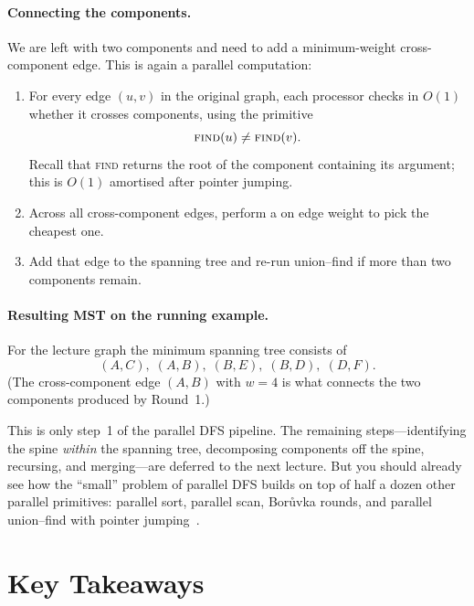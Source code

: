 \paragraph{Connecting the components.}
We are left with two components and need to add a minimum-weight
cross-component edge.  This is again a parallel computation:

\begin{enumerate}
  \item For every edge $(u,v)$ in the original graph, each processor
        checks in $O(1)$ whether it crosses components, using the
        primitive
        \[
          \textsc{find}(u) \neq \textsc{find}(v).
        \]
        Recall that \textsc{find} returns the root of the component
        containing its argument; this is $O(1)$ amortised after
        pointer jumping.
  \item Across all cross-component edges, perform a  on edge weight to pick the cheapest one.
  \item Add that edge to the spanning tree and re-run union--find if
        more than two components remain.
\end{enumerate}

\paragraph{Resulting MST on the running example.}
For the lecture graph the minimum spanning tree consists of
\[
  (A,C),\; (A,B),\; (B,E),\; (B,D),\; (D,F).
\]
(The cross-component edge $(A,B)$ with $w = 4$ is what connects the
two components produced by Round~1.)

\begin{ppnote}
This is only step~1 of the parallel DFS pipeline.  The remaining
steps---identifying the spine \emph{within} the spanning tree,
decomposing components off the spine, recursing, and merging---are
deferred to the next lecture.  But you should already see how the
``small'' problem of parallel DFS builds on top of half a dozen
other parallel primitives: parallel sort, parallel scan, Bor\r{u}vka
rounds, and parallel union--find with pointer jumping~\cite{bader2005}.
\end{ppnote}

\section*{Key Takeaways}

